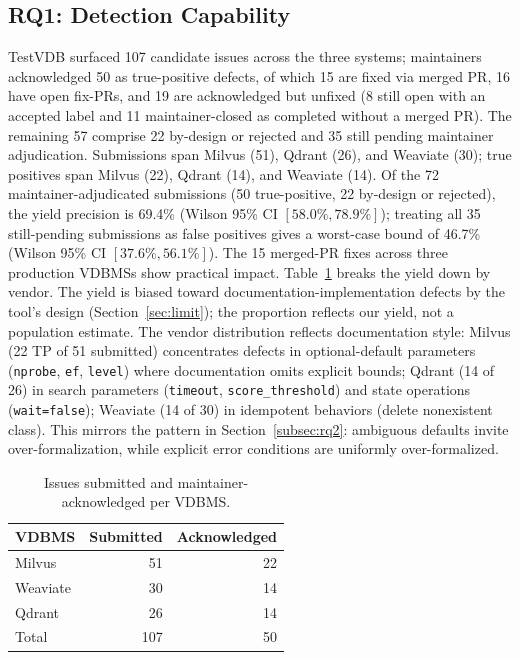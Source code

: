\documentclass[sigconf]{acmart}
\begin{document}
\subsection{RQ1: Detection Capability}
\label{subsec:rq1}
TestVDB surfaced 107 candidate issues across the three systems; maintainers acknowledged 50 as true-positive defects, of which 15 are fixed via merged PR, 16 have open fix-PRs, and 19 are acknowledged but unfixed (8 still open with an accepted label and 11 maintainer-closed as completed without a merged PR). The remaining 57 comprise 22 by-design or rejected and 35 still pending maintainer adjudication. Submissions span Milvus (51), Qdrant (26), and Weaviate (30); true positives span Milvus (22), Qdrant (14), and Weaviate (14). Of the 72 maintainer-adjudicated submissions (50 true-positive, 22 by-design or rejected), the yield precision is 69.4\% (Wilson 95\% CI $[58.0\%, 78.9\%]$); treating all 35 still-pending submissions as false positives gives a worst-case bound of 46.7\% (Wilson 95\% CI $[37.6\%, 56.1\%]$). The 15 merged-PR fixes across three production VDBMSs show practical impact. Table~\ref{tab:yield} breaks the yield down by vendor. The yield is biased toward documentation-implementation defects by the tool's design (Section~\ref{sec:limit}); the proportion reflects our yield, not a population estimate. The vendor distribution reflects documentation style: Milvus (22 TP of 51 submitted) concentrates defects in optional-default parameters (\texttt{nprobe}, \texttt{ef}, \texttt{level}) where documentation omits explicit bounds; Qdrant (14 of 26) in search parameters (\texttt{timeout}, \texttt{score\_threshold}) and state operations (\texttt{wait=false}); Weaviate (14 of 30) in idempotent behaviors (delete nonexistent class). This mirrors the pattern in Section~\ref{subsec:rq2}: ambiguous defaults invite over-formalization, while explicit error conditions are uniformly over-formalized.

\begin{table}[t]
\caption{Issues submitted and maintainer-acknowledged per VDBMS.}
\label{tab:yield}
\small
\begin{tabular}{@{}lrr@{}}
\toprule
VDBMS & Submitted & Acknowledged \\
\midrule
Milvus & 51 & 22 \\
Weaviate & 30 & 14 \\
Qdrant & 26 & 14 \\
\midrule
Total & 107 & 50 \\
\bottomrule
\end{tabular}
\end{table}
\end{document}
